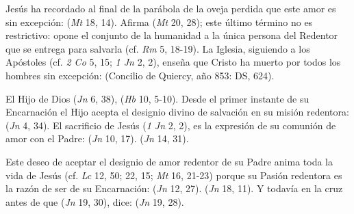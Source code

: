 \begin{ccebody}
 Jesús ha recordado al final de la parábola de la oveja perdida que este amor es sin excepción:  (\textit{Mt} 18, 14). Afirma  (\textit{Mt} 20, 28); este último término no es restrictivo: opone el conjunto de la humanidad a la única persona del Redentor que se entrega para salvarla (cf. \textit{Rm} 5, 18-19). La Iglesia, siguiendo a los Apóstoles (cf. \textit{2 Co} 5, 15; \textit{1 Jn} 2, 2), enseña que Cristo ha muerto por todos los hombres sin excepción:  (Concilio de Quiercy, año 853: DS, 624).


 El Hijo de Dios  (\textit{Jn} 6, 38),  (\textit{Hb} 10, 5-10). Desde el primer instante de su Encarnación el Hijo acepta el designio divino de salvación en su misión redentora:  (\textit{Jn} 4, 34). El sacrificio de Jesús  (\textit{1 Jn} 2, 2), es la expresión de su comunión de amor con el Padre:  (\textit{Jn} 10, 17).  (\textit{Jn} 14, 31).

 Este deseo de aceptar el designio de amor redentor de su Padre anima toda la vida de Jesús (cf. \textit{Lc} 12, 50; 22, 15; \textit{Mt} 16, 21-23) porque su Pasión redentora es la razón de ser de su Encarnación:  (\textit{Jn} 12, 27).  (\textit{Jn} 18, 11). Y todavía en la cruz antes de que  (\textit{Jn} 19, 30), dice:  (\textit{Jn} 19, 28).



\end{ccebody}
